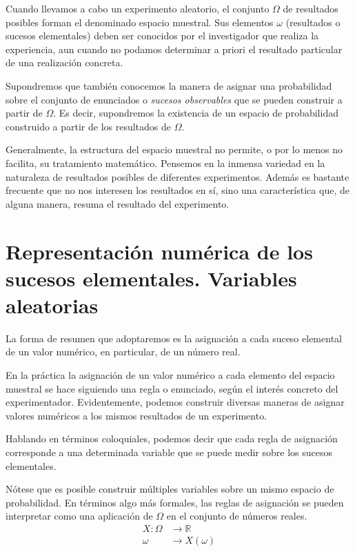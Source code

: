 \documentclass[
  a4paper,
  DIV=11,
  numbers=noendperiod]{scrreprt}
\begin{document}
Cuando llevamos a cabo un experimento aleatorio, el conjunto \(\Omega\)
de resultados posibles forman el denominado espacio muestral. Sus
elementos \(\omega\) (resultados o sucesos elementales) deben ser
conocidos por el investigador que realiza la experiencia, aun cuando no
podamos determinar a priori el resultado particular de una realización
concreta.

Supondremos que también conocemos la manera de asignar una probabilidad
sobre el conjunto de enunciados o \emph{sucesos observables} que se
pueden construir a partir de \(\Omega\). Es decir, supondremos la
existencia de un espacio de probabilidad construido a partir de los
resultados de \(\Omega\).

Generalmente, la estructura del espacio muestral no permite, o por lo
menos no facilita, su tratamiento matemático. Pensemos en la inmensa
variedad en la naturaleza de resultados posibles de diferentes
experimentos. Además es bastante frecuente que no nos interesen los
resultados en sí, sino una característica que, de alguna manera, resuma
el resultado del experimento.

\section{Representación numérica de los sucesos elementales. Variables
aleatorias}\label{representaciuxf3n-numuxe9rica-de-los-sucesos-elementales.-variables-aleatorias}

La forma de resumen que adoptaremos es la asignación a cada suceso
elemental de un valor numérico, en particular, de un número real.

En la práctica la asignación de un valor numérico a cada elemento del
espacio muestral se hace siguiendo una regla o enunciado, según el
interés concreto del experimentador. Evidentemente, podemos construir
diversas maneras de asignar valores numéricos a los mismos resultados de
un experimento.

Hablando en términos coloquiales, podemos decir que cada regla de
asignación corresponde a una determinada variable que se puede medir
sobre los sucesos elementales.

Nótese que es posible construir múltiples variables sobre un mismo
espacio de probabilidad. En términos algo más formales, las reglas de
asignación se pueden interpretar como una aplicación de \(\Omega\) en el
conjunto de números reales. \[
\begin{aligned}
X: \Omega & \rightarrow \mathbb{R} \\
\omega & \rightarrow X(\omega)
\end{aligned}
\]
\end{document}
